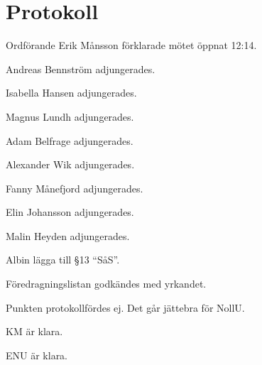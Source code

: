 \documentclass[10pt]{article}
\def\mo{Erik Månsson}
\begin{document}
\section*{Protokoll}
\begin{paragrafer}
Ordförande {\mo} förklarade mötet öppnat 12:14.

{\valavmo}

{\valavms}

{\valavj}

{\tosg}

Andreas Bennström adjungerades.

Isabella Hansen adjungerades.

Magnus Lundh adjungerades.

Adam Belfrage adjungerades.

Alexander Wik  adjungerades.

Fanny Månefjord  adjungerades.

Elin Johansson adjungerades.

Malin Heyden adjungerades.


Albin \ypa lägga till \S13 ``SåS''.

Föredragningslistan godkändes med yrkandet.


\begin{fyllnadsval} %
\end{fyllnadsval}

\begin{paragrafer}
Punkten protokollfördes ej.
Det går jättebra för NollU.

KM är klara.

ENU är klara.


\end{paragrafer}
\end{paragrafer}
\end{document}
